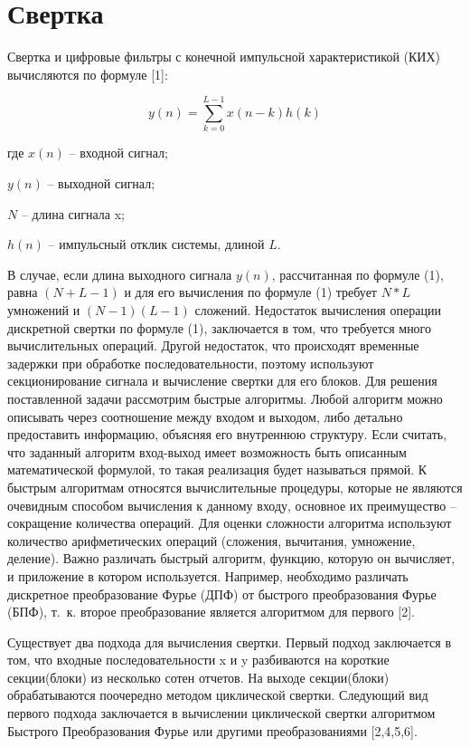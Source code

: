 \section{Свертка} \label{sec:ch3/sect4}

Свертка и цифровые фильтры с конечной импульсной характеристикой (КИХ) вычисляются по формуле [1]:

\begin{equation}
	\label{eq:y(n)}
	y(n) = \sum_{k=0}^{L-1}x(n-k)h(k)
\end{equation}

где $x(n)$ -- входной сигнал;

$y(n)$ -- выходной сигнал; 

$N$ -- длина сигнала x;

$h(n)$ -- импульсный отклик системы, длиной $L$. 

В случае, если длина выходного сигнала $y(n)$,  рассчитанная по формуле (1), равна $(N+L-1)$ и для его вычисления по формуле (1) требует $N*L$ умножений и $(N-1)(L-1)$ сложений. 
Недостаток вычисления операции дискретной свертки по формуле (1), заключается в том, что требуется много вычислительных операций. Другой недостаток, что происходят временные задержки при обработке последовательности, поэтому используют секционирование сигнала и вычисление свертки для его блоков.
Для решения поставленной задачи рассмотрим быстрые алгоритмы. Любой алгоритм можно описывать через соотношение между входом и выходом, либо детально предоставить информацию, объясняя его внутреннюю структуру. Если считать, что заданный алгоритм вход-выход  имеет возможность  быть описанным математической формулой, то такая реализация будет называться прямой. К быстрым алгоритмам относятся вычислительные процедуры, которые не являются очевидным способом вычисления к данному входу, основное их преимущество – сокращение количества операций.  Для оценки сложности алгоритма используют количество арифметических операций (сложения, вычитания, умножение, деление). Важно различать быстрый алгоритм, функцию, которую он вычисляет, и приложение в котором используется. Например, необходимо различать дискретное преобразование Фурье (ДПФ) от быстрого преобразования Фурье (БПФ), т.~к.  второе преобразование является  алгоритмом для первого [2]. 

Существует два подхода для вычисления свертки. Первый подход заключается в том, что входные последовательности x и y разбиваются на короткие секции(блоки) из несколько сотен отчетов. На выходе секции(блоки) обрабатываются поочередно методом циклической свертки. Следующий вид первого подхода заключается в вычислении циклической свертки алгоритмом Быстрого Преобразования Фурье или другими преобразованиями [2,4,5,6].

